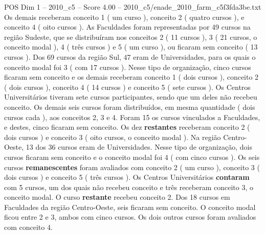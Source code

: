 \begin{textsample}{POS Dim 1 – 2010\_c5 – Score 4.00 – 2010\_c5/enade\_2010\_farm\_c5f3fda3be.txt}
Os demais receberam conceito 1 ( um curso ), conceito 2 ( quatro cursos ), e conceito 4 ( oito cursos ).
As Faculdades foram representadas por 49 cursos na região Sudeste, que se distribuíram nos conceitos 2 ( 11 cursos ), 3 ( 21 cursos, o conceito modal ), 4 ( três cursos ) e 5 ( um curso ), ou ficaram sem conceito ( 13 cursos ).
Dos 69 cursos da região Sul, 47 eram de Universidades, para os quais o conceito modal foi 3 ( com 17 cursos ).
Nesse tipo de organização, cinco cursos ficaram sem conceito e os demais receberam conceito 1 ( dois cursos ), conceito 2 ( dois cursos ), conceito 4 ( 14 cursos ) e conceito 5 ( sete cursos ).
Os Centros Universitários tiveram sete cursos participantes, sendo que um deles não recebeu conceito.
Os demais seis cursos foram distribuídos, em mesma quantidade ( dois cursos cada ), aos conceitos 2, 3 e 4.
Foram 15 os cursos vinculados a Faculdades, e destes, cinco ficaram sem conceito.
Os dez \textbf{restantes} receberam conceito 2 ( dois cursos ) e conceito 3 ( oito cursos, o conceito modal ).
Na região Centro-Oeste, 13 dos 36 cursos eram de Universidades.
Nesse tipo de organização, dois cursos ficaram sem conceito e o conceito modal foi 4 ( com cinco cursos ).
Os seis cursos \textbf{remanescentes} foram avaliados com conceito 2 ( um curso ), conceito 3 ( dois cursos ) e conceito 5 ( três cursos ).
Os Centros Universitários \textbf{contaram} com 5 cursos, um dos quais não recebeu conceito e três receberam conceito 3, o conceito modal.
O curso \textbf{restante} recebeu conceito 2.
Dos 18 cursos em Faculdades da região Centro-Oeste, seis ficaram sem conceito.
O conceito modal ficou entre 2 e 3, ambos com cinco cursos.
Os dois outros cursos foram avaliados com conceito 4.

\end{textsample}
